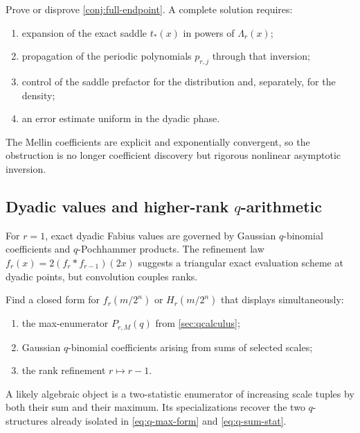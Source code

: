 \documentclass[11pt,a4paper]{article}
\theoremstyle{frontier}
\theoremstyle{definition}
\begin{document}
\begin{frontierproblem}
Prove or disprove \cref{conj:full-endpoint}.  A complete solution requires:
\begin{enumerate}[label=(\roman*)]
\item expansion of the exact saddle $t_*(x)$ in powers of $\Lambda_r(x)$;
\item propagation of the periodic polynomials $p_{r,j}$ through that inversion;
\item control of the saddle prefactor for the distribution and, separately, for the density;
\item an error estimate uniform in the dyadic phase.
\end{enumerate}
The Mellin coefficients are explicit and exponentially convergent, so the obstruction is no longer coefficient discovery but rigorous nonlinear asymptotic inversion.
\end{frontierproblem}

\subsection{Dyadic values and higher-rank \texorpdfstring{$q$}{q}-arithmetic}

For $r=1$, exact dyadic Fabius values are governed by Gaussian $q$-binomial coefficients and $q$-Pochhammer products.  The refinement law
$f_r(x)=2(f_r*f_{r-1})(2x)$ suggests a triangular exact evaluation scheme at dyadic points, but convolution couples ranks.

\begin{frontierproblem}
Find a closed form for $f_r(m/2^n)$ or $H_r(m/2^n)$ that displays simultaneously:
\begin{enumerate}[label=(\roman*)]
\item the max-enumerator $P_{r,M}(q)$ from \cref{sec:qcalculus};
\item Gaussian $q$-binomial coefficients arising from sums of selected scales;
\item the rank refinement $r\mapsto r-1$.
\end{enumerate}
A likely algebraic object is a two-statistic enumerator of increasing scale tuples by both their sum and their maximum.  Its specializations recover the two $q$-structures already isolated in \eqref{eq:q-max-form} and \eqref{eq:q-sum-stat}.
\end{frontierproblem}
\end{document}
